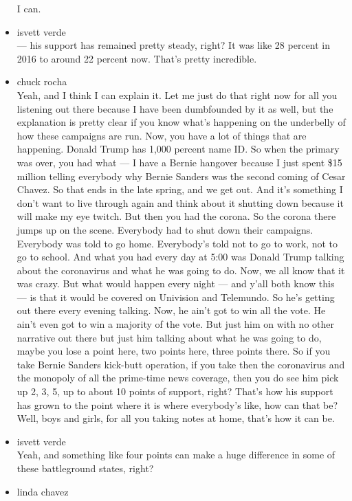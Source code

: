 \begin{itemize}
  I can.
\item
  isvett verde\\
  --- his support has remained pretty steady, right? It was like 28
  percent in 2016 to around 22 percent now. That's pretty incredible.
\item
  chuck rocha\\
  Yeah, and I think I can explain it. Let me just do that right now for
  all you listening out there because I have been dumbfounded by it as
  well, but the explanation is pretty clear if you know what's happening
  on the underbelly of how these campaigns are run. Now, you have a lot
  of things that are happening. Donald Trump has 1,000 percent name ID.
  So when the primary was over, you had what --- I have a Bernie
  hangover because I just spent \$15 million telling everybody why
  Bernie Sanders was the second coming of Cesar Chavez. So that ends in
  the late spring, and we get out. And it's something I don't want to
  live through again and think about it shutting down because it will
  make my eye twitch. But then you had the corona. So the corona there
  jumps up on the scene. Everybody had to shut down their campaigns.
  Everybody was told to go home. Everybody's told not to go to work, not
  to go to school. And what you had every day at 5:00 was Donald Trump
  talking about the coronavirus and what he was going to do. Now, we all
  know that it was crazy. But what would happen every night --- and
  y'all both know this --- is that it would be covered on Univision and
  Telemundo. So he's getting out there every evening talking. Now, he
  ain't got to win all the vote. He ain't even got to win a majority of
  the vote. But just him on with no other narrative out there but just
  him talking about what he was going to do, maybe you lose a point
  here, two points here, three points there. So if you take Bernie
  Sanders kick-butt operation, if you take then the coronavirus and the
  monopoly of all the prime-time news coverage, then you do see him pick
  up 2, 3, 5, up to about 10 points of support, right? That's how his
  support has grown to the point where it is where everybody's like, how
  can that be? Well, boys and girls, for all you taking notes at home,
  that's how it can be.
\item
  isvett verde\\
  Yeah, and something like four points can make a huge difference in
  some of these battleground states, right?
\item
  linda chavez\\

\end{itemize}
